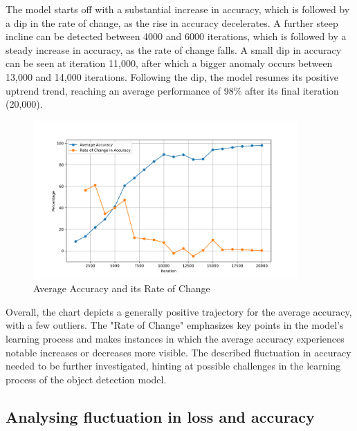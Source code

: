 The model starts off with a substantial increase in accuracy, which is followed by a dip in the rate of change, as the rise in accuracy 
decelerates. A further steep incline can be detected between 4000 and 6000 iterations, which is followed by a steady increase in accuracy, as
the rate of change falls. A small dip in accuracy can be seen at iteration 11,000, after which a bigger anomaly occurs between 13,000
and 14,000 iterations. Following the dip, the model resumes its positive uptrend trend, reaching an average performance of 98\% after its final
iteration (20,000).

\newpage

\begin{figure}[h]
   \centering
   \includegraphics[width=0.9\textwidth]{../Data/accuracy-improvement-graph.png}
   \caption{Average Accuracy and its Rate of Change}
   \label{fig:accuracy-improvement}
\end{figure}

Overall, the chart depicts a generally positive trajectory for the average accuracy, with a few outliers. The "Rate of Change" emphasizes
key points in the model's learning process and makes instances in which the average accuracy experiences notable increases or decreases more
visible. The described fluctuation in accuracy needed to be further investigated, hinting at possible
challenges in the learning process of the object detection model. \\


\subsection{Analysing fluctuation in loss and accuracy}

